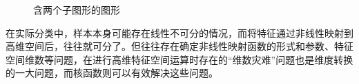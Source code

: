 \documentclass[bachelor,zhspacing]{cqu}  %
\begin{document}
\begin{figure}[H]
  \centering
  \qquad
  \caption{含两个子图形的图形}
\end{figure}

在实际分类中，样本本身可能存在线性不可分的情况，而将特征通过非线性映射到高维空间后，往往就可分了。但往往存在确定非线性映射函数的形式和参数、特征空间维数等问题，在进行高维特征空间运算时存在的``维数灾难''问题也是维度转换的一大问题，而核函数则可以有效解决这些问题。
\end{document}
